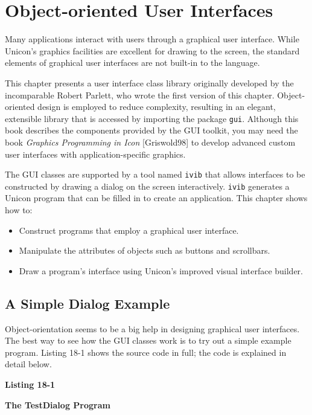 \chapter{Object-oriented User Interfaces}

Many applications interact with users through a graphical
user interface. While
Unicon's graphics facilities are
excellent for drawing to the screen,
the standard elements of graphical
user interfaces are not built-in to the language.

This chapter presents a user interface class library originally
developed by the incomparable Robert Parlett, who wrote the first
version of this chapter. Object-oriented design is employed to reduce
complexity, resulting in an elegant, extensible library that is
accessed by importing the package \texttt{gui}.  Although this book
describes the components provided by the GUI toolkit, you may need the
book \textit{Graphics Programming in Icon} [Griswold98] to develop
advanced custom user interfaces with application-specific graphics.

The GUI classes are supported by a tool named \texttt{ivib} that
allows interfaces to be constructed by drawing a dialog on the screen
interactively. \texttt{ivib} generates a Unicon program that can be
filled in to create an application. This chapter shows how to:

\begin{itemize}
\item Construct programs that employ a graphical user interface.
\item Manipulate the attributes of objects such as buttons and scrollbars.
\item Draw a program's interface using Unicon's improved visual
      interface builder.
\end{itemize}

\section{A Simple Dialog Example}

Object-orientation seems to be a big help in designing
graphical user interfaces. The best way to see how the GUI classes
work is to try out a simple example program. Listing 18-1 shows the
source code in full; the code is explained in detail below.

{\sffamily\bfseries
Listing 18-1}

{\sffamily\bfseries
The TestDialog Program}

